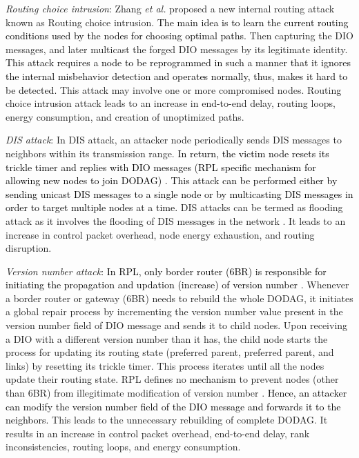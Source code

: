 \documentclass[10pt,journal,sort & compress]{IEEEtran}
\begin{document}
\textit{Routing choice intrusion}: Zhang \textit{et al.} \cite{zhang2015intrusion} proposed a new internal routing attack known as Routing choice intrusion. \textcolor{black}{The main idea is to learn the current routing conditions used by the nodes for choosing optimal paths.} Then capturing the DIO messages, and later multicast the forged DIO messages by its legitimate identity. \textcolor{black}{This attack requires a node to be reprogrammed in such a manner that it ignores the internal misbehavior detection and operates normally, thus, makes it hard to be detected.} This attack may involve one or more compromised nodes. Routing choice intrusion attack leads to an increase in end-to-end delay, routing loops, energy consumption, and creation of unoptimized paths. 

\textit{DIS attack}: In DIS attack, an attacker node periodically sends DIS messages to neighbors within its transmission range. \textcolor{black}{In return, the victim node resets its trickle timer and replies with DIO messages (RPL specific mechanism for allowing new nodes to join DODAG) \cite{vermaETT,TENCON2019}.} \textcolor{black}{This attack can be performed either by sending unicast DIS messages to a single node or by multicasting DIS messages in order to target multiple nodes at a time.} DIS attacks can be termed as flooding attack as it involves the flooding of DIS messages in the network \cite{Mayzaud2016Taxanomy}. It leads to an increase in control packet overhead, node energy exhaustion, and routing disruption.   

\textit{Version number attack}: \textcolor{black}{In RPL, only border router ($ 6 $BR) is responsible for initiating the propagation and updation (increase) of version number \cite{winter2012rpl}.} {Whenever a border router or gateway (6BR) needs to rebuild the whole DODAG, it initiates a global repair process by incrementing the version number value present in the version number field of DIO message and sends it to child nodes.} Upon receiving a DIO with a different version number than it has, the child node starts the process for updating its routing state (preferred parent, preferred parent, and links) by resetting its trickle timer. This process iterates until all the nodes update their routing state. RPL defines no mechanism to prevent nodes (other than $ 6 $BR) from illegitimate modification of version number \cite{Dvir2011,landsmann2013topology, Mayzaud2016Version}. \textcolor{black}{Hence, an attacker can modify the version number field of the DIO message and forwards it to the neighbors.} This leads to the unnecessary rebuilding of complete DODAG. It results in an increase in control packet overhead, end-to-end delay, rank inconsistencies, routing loops, and energy consumption. 
\end{document}
